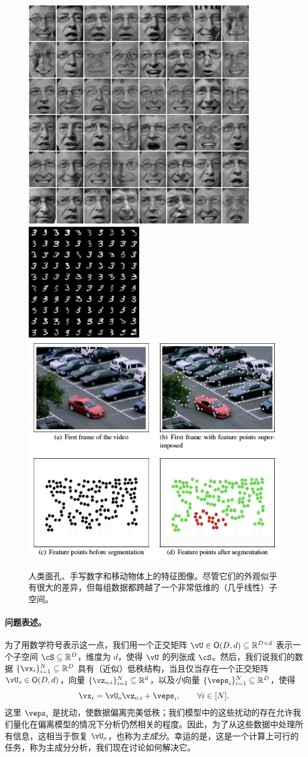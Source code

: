 \documentclass[../../book-main.tex]{subfiles}
\begin{document}
\begin{figure}
    \centering
    \includegraphics[width=0.3\linewidth]{figs_chap2/faces.png}
    \includegraphics[width=0.295\linewidth]{figs_chap2/handwritten-digits.png}
    \includegraphics[width=0.35\linewidth]{figs_chap2/motion.png}    
    \caption{人类面孔、手写数字和移动物体上的特征图像。尽管它们的外观似乎有很大的差异，但每组数据都跨越了一个非常低维的（几乎线性）子空间。}
    \label{fig:enter-label}
\end{figure}

\paragraph{问题表述。}
为了用数学符号表示这一点，我们用一个正交矩阵 \(\vU \in \O(D, d) \subseteq \R^{D \times d}\) 表示一个子空间 \(\cS \subseteq \R^{D}\)，维度为 \(d\)，使得 \(\vU\) 的列张成 \(\cS\)。然后，我们说我们的数据 \(\{\vx_{i}\}_{i = 1}^{N} \subseteq \R^{D}\) 具有（近似）低秩结构，当且仅当存在一个正交矩阵 \(\vU_{o} \in \O(D, d)\)，向量 \(\{\vz_{o, i}\}_{i = 1}^{N} \subseteq \R^{d}\)，以及\textit{小}向量 \(\{\veps_{i}\}_{i = 1}^{N} \subseteq \R^{D}\)，使得
\begin{equation}\label{eq:pca_dgp}
    \vx_{i} = \vU_{o}\vz_{o, i} + \veps_{i}, \qquad \forall i \in [N].
\end{equation}
这里 \(\veps_{i}\) 是扰动，使数据偏离完美低秩；我们模型中的这些扰动的存在允许我们量化在偏离模型的情况下分析仍然相关的程度。因此，为了从这些数据中处理所有信息，这相当于恢复 \(\vU_{o}\)，也称为\textit{主成分}。幸运的是，这是一个计算上可行的任务，称为主成分分析，我们现在讨论如何解决它。
\end{document}
